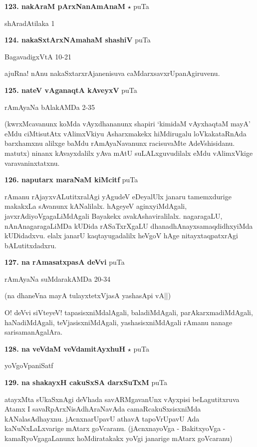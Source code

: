 \medskip
\noindent\textbf{123. nakAraM pArxNanAmAnaM} $\star$ \hfill puTa \pageref{17}

\hfill shAradAtilaka 1

\medskip
\noindent\textbf{124. nakaSxtArxNAmahaM shashiV} \hfill puTa \pageref{98}

\hfill BagavadigxVtA 10-21

ajuRna! nAnu nakaSxtarxrAjanenisuva caMdarxsavxrUpanAgiruvenu.

\medskip
\noindent\textbf{125. nateV vAganaqtA kAveyxV} \hfill puTa \pageref{209}

\hfill rAmAyaNa bAlakAMDa 2-35

(kwrxMcavanunx koMda vAyxdhananunx shapiri `kimidaM vAyxhaqtaM mayA' eMdu ciMtisutAtx vAlimxVkiyu Asharxmakekx hiMdirugalu loVkakataRnAda barxhamxnu alilxge baMdu rAmAyaNavanunx racisuvaMte AdeVshisidanu. matutx) ninanx kAvayxdalilx yAva mAtU suLALxguvudilalx eMdu vAlimxVkige varavaninxtatxnu.

\medskip
\noindent\textbf{126. naputarx maraNaM kiMcitf} \hfill puTa \pageref{180}

rAmanu rAjayxvALutitxralAgi yAgudeV eDeyalUlx janaru tamemxdurige makakxLa sAvanunx kANalilalx. hAgeyeV aginxyiMdAgali, javxrAdiyoVgagaLiMdAgali Bayakekx avakAshaviralilalx. nagaragaLU, nAnAnagaragaLiMDa kUDida rASaTxrXgaLU dhanadhAnayxsamaqdidhxyiMda kUDidadxvu. elalx janarU kaqtayugadalilx heVgoV hAge nitayxtaqpatxrAgi bALutitxdadxru.

\medskip
\noindent\textbf{127. na rAmasatxpasA deVvi} \hfill puTa \pageref{191}

\hfill rAmAyaNa suMdarakAMDa 20-34

(na dhaneVna mayA tulayxtetxVjasA yashasApi vA||)

O! deVvi siVteyeV! tapasisxniMdalAgali, baladiMdAgali, parAkarxmadiMdAgali, haNadiMdAgali, teVjasisxniMdAgali, yashasisxniMdAgali rAmanu nanage sarisamanAgalAra. 

\medskip
\noindent\textbf{128. na veVdaM veVdamitAyxhuH}  $\star$ \hfill puTa \pageref{13c}

\hfill yoVgoVpaniSatf

\medskip
\noindent\textbf{129. na shakayxH cakuSxSA darxSuTxM} \hfill puTa \pageref{246}

atayxMta sUkaSxnAgi deVhada savARMgavanUnx vAyxpisi beLagutitxruva Atamx I savaRpArxNisAdhAraNavAda camaRcakuSxsisxniMda kANalasAdhayxnu. jAcnxnarUpavU athavA tapoVrUpavU Ada kaNuNxLaLxvarige mAtarx goVcaranu. (jAcnxnayoVga - BakitxyoVga - kamaRyoVgagaLanunx hoMdiratakakx yoVgi janarige mAtarx goVcaranu)


